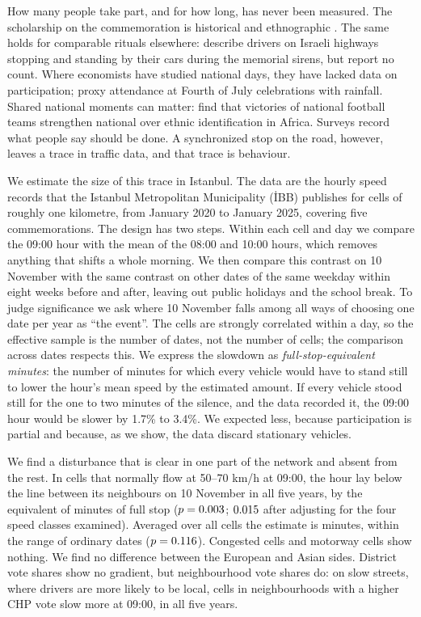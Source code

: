 \documentclass[11pt,a4paper]{article}
\begin{document}
How many people take part, and for how long, has never been measured. The scholarship on the
commemoration is historical and ethnographic \citep{uzun2019,ozyurek2004,goldman2018}. The same holds
for comparable rituals elsewhere: \citet{vinitzky2010} describe drivers on Israeli highways stopping
and standing by their cars during the memorial sirens, but report no count. Where economists have
studied national days, they have lacked data on participation; \citet{madestam2011} proxy attendance
at Fourth of July celebrations with rainfall. Shared national moments can matter:
\citet{depetris2020} find that victories of national football teams strengthen national over ethnic
identification in Africa. Surveys record what people say should be done. A
synchronized stop on the road, however, leaves a trace in traffic data, and that trace is behaviour.

We estimate the size of this trace in Istanbul. The data are the hourly speed records that the
Istanbul Metropolitan Municipality (İBB) publishes for cells of roughly one kilometre, from January
2020 to January 2025, covering five commemorations. The design has two steps. Within each cell and day
we compare the 09:00 hour with the mean of the 08:00 and 10:00 hours, which removes anything that
shifts a whole morning. We then compare this contrast on 10 November with the same contrast on
other dates of the same weekday within eight weeks before and after, leaving out public holidays and
the school break. To judge significance we ask where 10 November falls among all ways of choosing
one date per year as ``the event''. The cells are strongly correlated within a day, so the effective
sample is the number of dates, not the number of cells; the comparison across dates respects this.
We express the slowdown as \emph{full-stop-equivalent minutes}: the number of minutes for which every
vehicle would have to stand still to lower the hour's mean speed by the estimated amount. If every
vehicle stood still for the one to two minutes of the silence, and the data recorded it, the 09:00
hour would be slower by 1.7\% to 3.4\%. We expected less, because participation is partial and
because, as we show, the data discard stationary vehicles.

We find a disturbance that is clear in one part of the network and absent from the rest. In cells
that normally flow at 50--70 km/h at 09:00, the hour lay below the line between its neighbours on
10 November in all five years, by the equivalent of \minFast{} minutes of full stop
($p = 0.003$; $0.015$ after adjusting for the four speed classes examined). Averaged over all
cells the estimate is \minAll{} minutes, within the range of ordinary dates
($p = 0.116$). Congested cells and motorway cells show nothing. We find no difference between the
European and Asian sides. District vote shares show no gradient, but neighbourhood vote shares do: on
slow streets, where drivers are more likely to be local, cells in neighbourhoods with a higher CHP vote
slow more at 09:00, in all five years.
\end{document}
